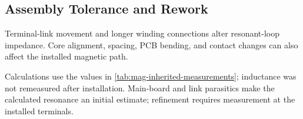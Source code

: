 \subsection{Assembly Tolerance and Rework}
\label{sec:mag-mechanical}

Terminal-link movement and longer winding connections alter resonant-loop impedance. Core alignment, spacing, PCB bending, and contact changes can also affect the installed magnetic path.

Calculations use the values in \cref{tab:mag-inherited-measurements}; inductance was not remeasured after installation. Main-board and link parasitics make the calculated resonance an initial estimate; refinement requires measurement at the installed terminals.
